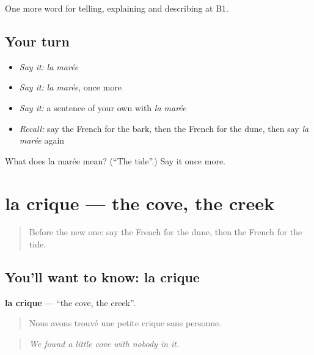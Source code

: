 \begin{grammarlens}[title={What you've built}]
One more word for telling, explaining and describing at B1.
\end{grammarlens}

\subsection*{Your turn}
\begin{itemize}
\raggedright
  \item \emph{Say it:} \emph{la marée}
  \item \emph{Say it:} \emph{la marée}, once more
  \item \emph{Say it:} a sentence of your own with \emph{la marée}
  \item \emph{Recall:} say the French for the bark, then the French for the dune, then say \emph{la marée} again
\end{itemize}

\begin{tcolorbox}[breakable,colback=teal!4,colframe=teal!35!black,title={Before you move on}]
What does la marée mean? (\textquotedblleft{}The tide\textquotedblright{}.) Say it once more.
\end{tcolorbox}
\section[la crique]{la crique — the cove, the creek}

\label{lesson:FR-C458-crique}



\begin{quote}
Before the new one: say the French for the dune, then the French for the tide.
\end{quote}

\subsection*{You'll want to know: la crique}
\textbf{la crique} — \textquotedblleft{}the cove, the creek\textquotedblright{}.

\begin{quote}
Nous avons trouvé une petite crique sans personne.
\end{quote}

\begin{quote}
\emph{We found a little cove with nobody in it.}
\end{quote}

